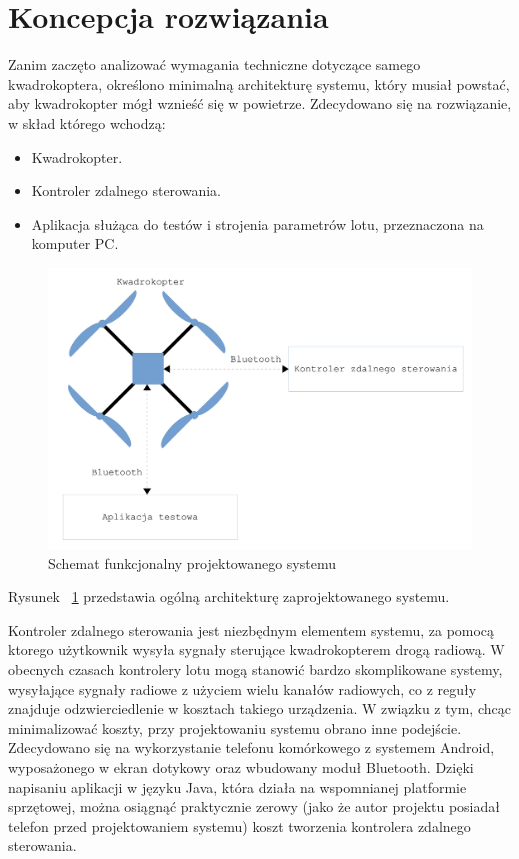 \section{Koncepcja rozwiązania}

Zanim zaczęto analizować wymagania techniczne dotyczące samego kwadrokoptera, określono minimalną architekturę systemu, który musiał powstać, aby kwadrokopter mógł wznieść się w powietrze. Zdecydowano się na rozwiązanie, w skład którego wchodzą:

\begin{itemize}
	\item Kwadrokopter.
	\item Kontroler zdalnego sterowania.
	\item Aplikacja służąca do testów i strojenia parametrów lotu, przeznaczona na komputer PC.
\end{itemize}

\begin{figure}[H]
	\centering
	\includegraphics[scale=0.1]{Pictures/SchematSystemu.png}
	\caption[Schemat blokowy systemu]{Schemat funkcjonalny projektowanego systemu}
	\label{fig:SchematSystemu}
\end{figure}



Rysunek ~\ref{fig:SchematSystemu} przedstawia ogólną architekturę zaprojektowanego systemu.

Kontroler zdalnego sterowania jest niezbędnym elementem systemu, za pomocą ktorego użytkownik wysyła sygnały sterujące kwadrokopterem drogą radiową. W obecnych czasach kontrolery lotu mogą stanowić bardzo skomplikowane systemy, wysyłające sygnały radiowe z użyciem wielu kanałów radiowych, co z reguły znajduje odzwierciedlenie w kosztach takiego urządzenia. W związku z tym, chcąc minimalizować koszty, przy projektowaniu systemu obrano inne podejście. Zdecydowano się na wykorzystanie telefonu komórkowego z systemem Android, wyposażonego w ekran dotykowy oraz wbudowany moduł Bluetooth. Dzięki napisaniu aplikacji w języku Java, która działa na wspomnianej platformie sprzętowej, można osiągnąć praktycznie zerowy (jako że autor projektu posiadał telefon przed projektowaniem systemu) koszt tworzenia kontrolera zdalnego sterowania. 

